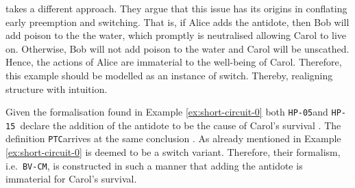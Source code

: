 \documentclass[11pt,a4paper]{book}
\theoremstyle{definition}
\theoremstyle{definition}
\theoremstyle{definition}
\theoremstyle{remark}
\newcommand{\hpu}{\texttt{HP-05}}
\newcommand{\ptc}{\texttt{PTC}}
\newcommand{\hpm}{\texttt{HP-15 }}
\newcommand{\bvcm}{\texttt{BV-CM}}
\begin{document}
\begin{center}
\end{center}


\parencite{beckers2018principled} takes a different approach. They argue that this issue has its origins in conflating early preemption and switching. 
That is, if Alice adds the antidote, then Bob will add poison to the the water, which promptly is neutralised allowing Carol to live on.
Otherwise, Bob will not add poison to the water and Carol will be unscathed. Hence, the actions of Alice are immaterial to the well-being of Carol.
Therefore, this example should be modelled as an instance of switch. Thereby, realigning structure with intuition.



Given the formalisation found in Example \ref{ex:short-circuit-0} both \hpu and \hpm declare the addition of the antidote to be the cause of Carol's survival \parencite[p.~90]{halpern2016actual}. 
The definition \ptc arrives at the same conclusion \parencite{weslake2015partial}.  
As already mentioned  in \parencite{beckers2018principled} Example \ref{ex:short-circuit-0} is deemed to be a switch variant. Therefore, their formalism, i.e.\ \bvcm, is constructed in such a manner that adding the antidote is immaterial for Carol's survival.
\end{document}
